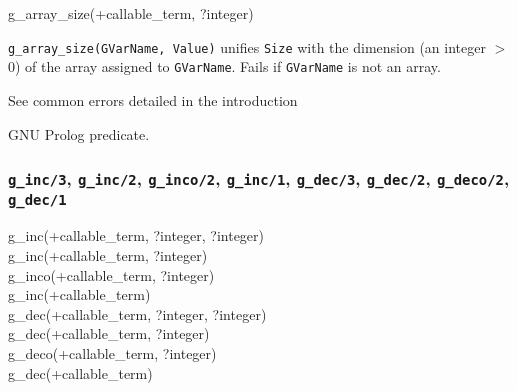 \begin{TemplatesOneCol}
g\_array\_size(+callable\_term, ?integer)

\end{TemplatesOneCol}

\Description

\texttt{g\_array\_size(GVarName, Value)} unifies \texttt{Size} with the
dimension (an integer $>$ 0) of the array assigned to \texttt{GVarName}.
Fails if \texttt{GVarName} is not an array.

\Errors

See common errors detailed in the introduction 

\begin{PlErrorsNoTitle}


\end{PlErrorsNoTitle}

\Portability

GNU Prolog predicate.

\subsubsection{\texttt{g\_inc/3},
               \texttt{g\_inc/2},
               \texttt{g\_inco/2},
               \texttt{g\_inc/1},
               \texttt{g\_dec/3},
               \texttt{g\_dec/2},
               \texttt{g\_deco/2},
               \texttt{g\_dec/1}}


\begin{TemplatesOneCol}
g\_inc(+callable\_term, ?integer, ?integer) \\
g\_inc(+callable\_term, ?integer) \\
g\_inco(+callable\_term, ?integer) \\
g\_inc(+callable\_term) \\
g\_dec(+callable\_term, ?integer, ?integer) \\
g\_dec(+callable\_term, ?integer) \\
g\_deco(+callable\_term, ?integer) \\
g\_dec(+callable\_term)

\end{TemplatesOneCol}

